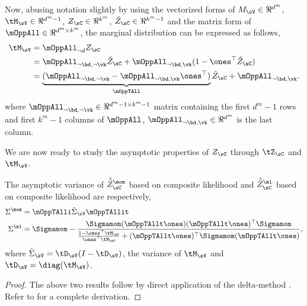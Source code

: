 Now, abusing notation slightly by using the vectorized forms of $M_\sV
\in \Re^{d^m}$, $\tM_\sV \in \Re^{d^m-1}$, $Z_\sC \in \Re^{k^m}$, $\tilde Z_\sC \in \Re^{k^m-1}$
and the matrix form of $\mOppAll \in \Re^{d^m \times k^m}$, the marginal
distribution can be expressed as follows,
\begin{align*}
  \tM_\sV 
        &= \mOppAll_{\neg d} Z_\sC \\
        &= \mOppAll_{\neg \bd, \neg \vk} \tilde Z_\sC + \mOppAll_{\neg \bd, \vk} (1 - \ones^\top \tilde Z_\sC) \\
        &= \underbrace{(\mOppAll_{\neg \bd, \neg \vk} -  \mOppAll_{\neg \bd, \vk}\ones^\top)}_{\mOppTAll} \tilde Z_\sC + \mOppAll_{\neg \bd, \vk}.
\end{align*}
where $\mOppAll_{\neg \bd, \neg \vk} \in \Re^{d^m -1 \times k^m - 1}$ matrix containing the
first $d^m-1$ rows and first $k^m-1$ columns of $\mOppAll$, $\mOppAll_{\neg \bd, \vk} \in \Re^{d^m}$ is the last column. 

We are now ready to study the asymptotic properties of $Z_\sC$ through
$\tZ_\sC$ and $\tM_\sV$.

\providecommand{\hatt}[1] {\hat{\tilde{#1}}}
\begin{lemma}
  \label{lem:mom-pw-variance}
  The asymptotic variance of $\hatt Z^\mom_{\sC}$ based on composite likelihood and 
  $\hatt Z^\ml_{\sC}$ based on composite likelihood are respectively,
  \begin{align*}
    \Sigma^{\mom} &= \mOppTAlli \tilde\Sigma_\sV \mOppTAllit \\
    \Sigma^{\ml} &= \Sigmamom - \frac{\Sigmamom (\mOppTAllt \ones)(\mOppTAllt \ones)^\top \Sigmamom}{\frac{1 - \ones^\top \tM_\sV}{\ones^\top \tM_\sV} + (\mOppTAllt \ones)^\top \Sigmamom (\mOppTAllt \ones)},
  \end{align*}
  where $\tilde \Sigma_\sV = \tD_\sV (I - \tD_\sV)$, the variance of $\tM_\sV$ and $\tD_\sV = \diag(\tM_\sV)$.
\end{lemma}
\begin{proof}
  The above two results follow by direct application of the delta-method
  \cite{vaart98asymptotic}. Refer to  for
  a complete derivation.
\end{proof}


